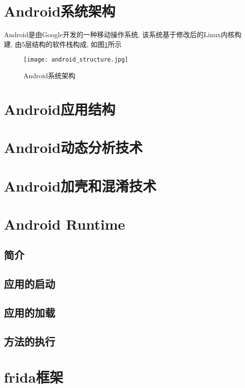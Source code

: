 \section{Android系统架构}
Android是由Google开发的一种移动操作系统, 该系统基于修改后的Linux内核构建, 由5层结构的软件栈构成, 如图\ref{androidStructure}所示\juhao
\begin{figure}[ht]
	\centering
	\texttt{[image: android\_structure.jpg]}
	\caption{Android系统架构}
	\label{androidStructure}
\end{figure}

\section{Android应用结构}
\section{Android动态分析技术}
\section{Android加壳和混淆技术}
\section{Android Runtime}
\subsection{简介}
\subsection{应用的启动}
\subsection{应用的加载}
\subsection{方法的执行}
\section{frida框架}
